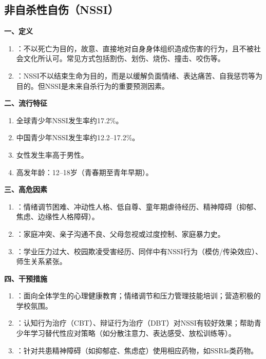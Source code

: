 \subsection{非自杀性自伤（NSSI）}

\begin{keybox}
\textbf{一、定义}
\begin{enumerate}[leftmargin=*]
    \item {}：不以死亡为目的，故意、直接地对自身身体组织造成伤害的行为，且不被社会文化所认可。常见方式包括割伤、划伤、烧伤、撞击、咬伤等。
    \item {}：NSSI不以结束生命为目的，而是以缓解负面情绪、表达痛苦、自我惩罚等为目的。但NSSI是未来自杀行为的重要预测因素。
\end{enumerate}

\textbf{二、流行特征}
\begin{enumerate}[leftmargin=*]
    \item 全球青少年NSSI发生率约17.2\%。
    \item 中国青少年NSSI发生率约12.2--17.2\%。
    \item 女性发生率高于男性。
    \item 高发年龄：12--18岁（青春期至青年早期）。
\end{enumerate}

\textbf{三、高危因素}
\begin{enumerate}[leftmargin=*]
    \item {}：情绪调节困难、冲动性人格、低自尊、童年期虐待经历、精神障碍（抑郁、焦虑、边缘性人格障碍）。
    \item {}：家庭冲突、亲子沟通不良、父母忽视或过度控制、家庭暴力史。
    \item {}：学业压力过大、校园欺凌受害经历、同伴中有NSSI行为（模仿/传染效应）、师生关系紧张。
\end{enumerate}

\textbf{四、干预措施}
\begin{enumerate}[leftmargin=*]
    \item {}：面向全体学生的心理健康教育；情绪调节和压力管理技能培训；营造积极的学校氛围。
    \item {}：认知行为治疗（CBT）、辩证行为治疗（DBT）对NSSI有较好效果；帮助青少年学习替代性应对策略（如分散注意力、表达感受、放松训练等）。
    \item {}：针对共患精神障碍（如抑郁症、焦虑症）使用相应药物，如SSRIs类药物。
\end{enumerate}
\end{keybox}

